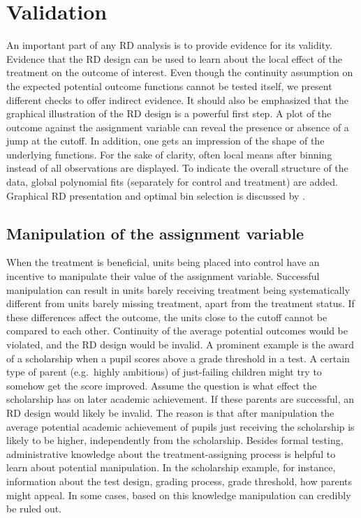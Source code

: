 


\section{Validation} \label{sec:validation}

An important part of any RD analysis is to provide evidence for its validity.
Evidence that the RD design can be used to learn about the local effect of the treatment on the outcome of interest.
Even though the continuity assumption on the expected potential outcome functions cannot be tested itself,
we present different checks to offer indirect evidence.
It should also be emphasized that the graphical illustration of the RD design is a powerful first step.
A plot of the outcome against the assignment variable can reveal the presence or absence of a jump at the cutoff.
In addition, one gets an impression of the shape of the underlying functions.
For the sake of clarity, often local means after binning instead of all observations are displayed.
To indicate the overall structure of the data, global polynomial fits (separately for control and treatment) are added.
Graphical RD presentation and optimal bin selection is discussed by \textcite{Calonico_2015a}.

\subsection{Manipulation of the assignment variable}

When the treatment is beneficial, units being placed into control have an incentive to manipulate their value of the assignment variable.
Successful manipulation can result in units barely receiving treatment being systematically different from units barely missing treatment,
apart from the treatment status.
If these differences affect the outcome, the units close to the cutoff cannot be compared to each other.
Continuity of the average potential outcomes would be violated, and the RD design would be invalid.
A prominent example is the award of a scholarship when a pupil scores above a grade threshold in a test.
A certain type of parent (e.g.\ highly ambitious) of just-failing children might try to somehow get the score improved.
Assume the question is what effect the scholarship has on later academic achievement.
If these parents are successful, an RD design would likely be invalid.
The reason is that after manipulation the average potential academic achievement of pupils just receiving the scholarship is likely to be higher,
independently from the scholarship.
Besides formal testing, administrative knowledge about the treatment-assigning process is helpful to learn about potential manipulation.
In the scholarship example, for instance, information about the test design, grading process, grade threshold, how parents might appeal.
In some cases, based on this knowledge manipulation can credibly be ruled out.

